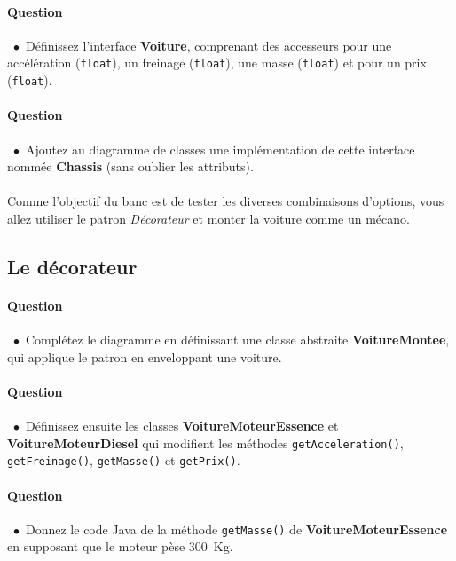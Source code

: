 \documentclass[a4paper,11pt]{exam}
\newcommand{\point}{$\bullet$\ }
\def\float{{\tt float}}
\begin{document}
\paragraph*{\textsf{Question \thequestion}}\ 
\point Définissez l'interface \textbf{Voiture}, comprenant des accesseurs pour une accélération (\float), un freinage (\float), une masse (\float) et pour un prix (\float).
\stepcounter{question} 
\paragraph*{\textsf{Question \thequestion}}\ 
\point Ajoutez au diagramme de classes une implémentation de cette interface nommée \textbf{Chassis} (sans oublier les attributs). \\\\


Comme l'objectif du banc est de tester les diverses combinaisons d'options, vous allez utiliser le patron \emph{Décorateur} et monter la voiture comme un mécano.

\subsection{Le décorateur}


\paragraph*{\textsf{Question \thequestion}}\ 
\point Complétez le diagramme en définissant une classe abstraite \textbf{VoitureMontee}, qui applique le patron en enveloppant une voiture.

\paragraph*{\textsf{Question \thequestion}}\ 
\point Définissez ensuite les classes \textbf{VoitureMoteurEssence} et \textbf{VoitureMoteurDiesel} qui modifient les méthodes
\texttt{getAcceleration()}, \texttt{getFreinage()}, \texttt{getMasse()} et \texttt{getPrix()}.

\stepcounter{question} 
\paragraph*{\textsf{Question \thequestion}}\ 
\point Donnez le code Java de la méthode \texttt{getMasse()} de \textbf{VoitureMoteurEssence} en supposant que le moteur pèse 300~Kg.
\end{document}
